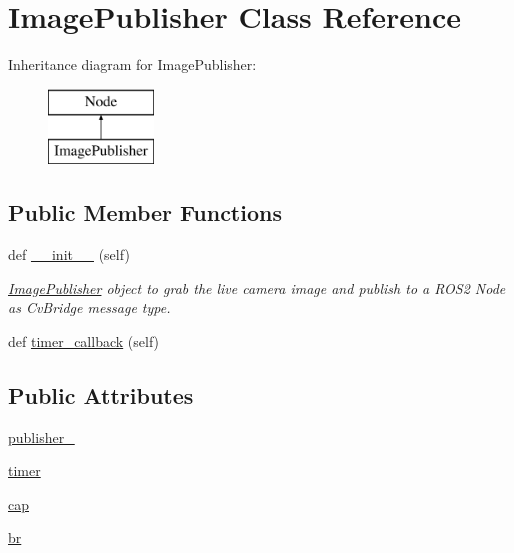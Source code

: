 \hypertarget{classtoxic__vision_1_1webcam__pub_1_1ImagePublisher}{}\section{Image\+Publisher Class Reference}
\label{classtoxic__vision_1_1webcam__pub_1_1ImagePublisher}
Inheritance diagram for Image\+Publisher\+:\begin{figure}[H]
\begin{center}
\leavevmode
\includegraphics[height=2.000000cm]{d2/da6/classtoxic__vision_1_1webcam__pub_1_1ImagePublisher}
\end{center}
\end{figure}
\subsection*{Public Member Functions}
\begin{DoxyCompactItemize}
\item 
def \mbox{\hyperlink{classtoxic__vision_1_1webcam__pub_1_1ImagePublisher_ae64f0875afe3067b97ba370b354b9213}{\+\_\+\+\_\+init\+\_\+\+\_\+}} (self)
\begin{DoxyCompactList}\small\item\em \mbox{\hyperlink{classtoxic__vision_1_1webcam__pub_1_1ImagePublisher}{Image\+Publisher}} object to grab the live camera image and publish to a R\+O\+S2 Node as Cv\+Bridge message type. \end{DoxyCompactList}\item 
def \mbox{\hyperlink{classtoxic__vision_1_1webcam__pub_1_1ImagePublisher_a9692d7a212fa89bc61dacc687e826097}{timer\+\_\+callback}} (self)
\end{DoxyCompactItemize}
\subsection*{Public Attributes}
\begin{DoxyCompactItemize}
\item 
\mbox{\hyperlink{classtoxic__vision_1_1webcam__pub_1_1ImagePublisher_a2ab19359a5607f32a7b39d6d9f61c3b5}{publisher\+\_\+}}
\item 
\mbox{\hyperlink{classtoxic__vision_1_1webcam__pub_1_1ImagePublisher_a9fabcf6aa0647a2414f7cb1a2ab2634a}{timer}}
\item 
\mbox{\hyperlink{classtoxic__vision_1_1webcam__pub_1_1ImagePublisher_a9499a5c7f196d66c6afe0222bd5a9219}{cap}}
\item 
\mbox{\hyperlink{classtoxic__vision_1_1webcam__pub_1_1ImagePublisher_a88f0860257ba6bdc089557444f5cdd16}{br}}
\end{DoxyCompactItemize}


